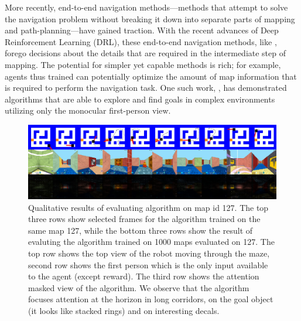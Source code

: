 More recently, end-to-end navigation methods---methods that attempt to  
solve the navigation problem without breaking it down into separate parts of mapping and path-planning---have gained traction.
%
With the recent advances of Deep Reinforcement Learning (DRL), these end-to-end navigation methods, like \cite{MnBaMiICML2016,SiHuMaNATURE2016,LePaKrISER2017,MiPaViICLR2017,OhChSiICML2016}, forego decisions about the details that are required in the intermediate step of mapping.
The potential for simpler yet capable methods is rich; for example, agents thus trained can potentially optimize the amount of map information that is required to perform the navigation task.
One such work, \cite{MiPaViICLR2017}, has demonstrated algorithms that are able to explore and find goals in complex environments utilizing only the monocular first-person view.

\begin{figure}
\includegraphics[width=\textwidth]{./exp-results/training-09x09-0127-on-0127.png}%
\caption{Qualitative results of evaluating algorithm on map id 127. The top three rows show selected frames for the algorithm trained on the same map 127, while the bottom three rows show the result of evaluting the algorithm trained on 1000 maps evaluated on 127. The top row shows the top view of the robot moving through the maze, second row shows the first person which is the only input available to the agent (except reward). The third row shows the attention masked view of the algorithm. We observe that the algorithm focuses attention at the horizon in long corridors, on the goal object (it looks like stacked rings) and on interesting decals.}
\label{fig:training-qualitative}
\end{figure}

